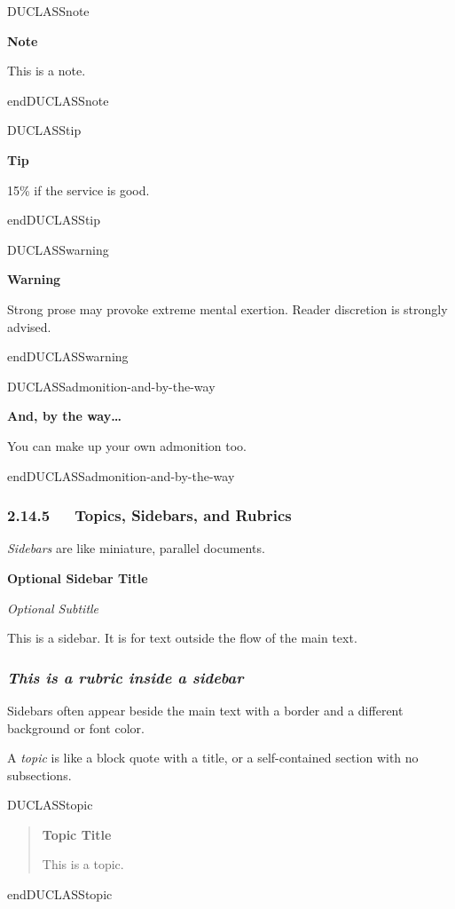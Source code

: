 \documentclass[a4paper]{article}
\newenvironment{DUclass}[1]%
    {%
     \def\DocutilsClassFunctionName{DUCLASS#1}
     \csname \DocutilsClassFunctionName \endcsname}%
    {\csname end\DocutilsClassFunctionName \endcsname}%
\newenvironment{DUadmonition}%
    {\begin{center}
       \begin{lrbox}{\DUadmonitionbox}
         \begin{minipage}{0.9\linewidth}
    }%
    {    \end{minipage}
       \end{lrbox}
       \fbox{\usebox{\DUadmonitionbox}}
     \end{center}
    }
\providecommand*{\DUrubric}[1]{\subsubsection*{\emph{#1}}}
\providecommand{\DUsidebar}[1]{%
  \begin{center}
    \colorbox[gray]{0.80}{\parbox{0.9\linewidth}{#1}}
  \end{center}
}
\providecommand*{\DUsubtitle}[1]{\par\emph{#1}\smallskip}
\providecommand*{\DUtitle}[1]{%
  \smallskip\noindent\textbf{#1}\smallskip}
\begin{document}
\begin{DUclass}{note}
\begin{DUadmonition}
\DUtitle{Note}

This is a note.
\end{DUadmonition}
\end{DUclass}

\begin{DUclass}{tip}
\begin{DUadmonition}
\DUtitle{Tip}

15\% if the service is good.
\end{DUadmonition}
\end{DUclass}

\begin{DUclass}{warning}
\begin{DUadmonition}
\DUtitle{Warning}

Strong prose may provoke extreme mental exertion.
Reader discretion is strongly advised.
\end{DUadmonition}
\end{DUclass}

\begin{DUclass}{admonition-and-by-the-way}
\begin{DUadmonition}
\DUtitle{And, by the way…}

You can make up your own admonition too.
\end{DUadmonition}
\end{DUclass}


\subsubsection{2.14.5   Topics, Sidebars, and Rubrics}

\emph{Sidebars} are like miniature, parallel documents.

\DUsidebar{
\DUtitle{Optional Sidebar Title}

\DUsubtitle{Optional Subtitle}

This is a sidebar.  It is for text outside the flow of the main
text.

\DUrubric{This is a rubric inside a sidebar}

Sidebars often appear beside the main text with a border and a different
background or font color.
}

A \emph{topic} is like a block quote with a title, or a self-contained section
with no subsections.

\begin{DUclass}{topic}
\begin{quote}
\DUtitle{Topic Title}

This is a topic.
\end{quote}
\end{DUclass}
\end{document}
